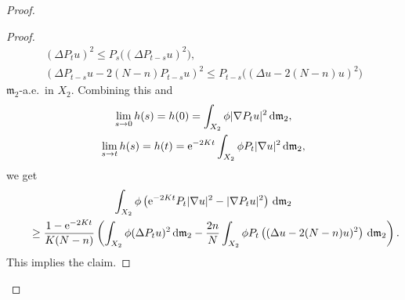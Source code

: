 \documentclass[pdftex]{sigma}
\numberwithin{equation}{section}
\theoremstyle{definition}
\newcommand{\mf}{\mathfrak{m}}
\begin{document}
\begin{proof}
\begin{proof}
\begin{gather*}
 (\Delta P_{t} u)^2\leq P_{s}\big((\Delta P_{t-s} u)^2\big),
 \\
 (\Delta P_{t-s} u-2(N-n)P_{t-s} u)^2\leq P_{t-s} \big( (\Delta u-2(N-n)u)^2\big)
\end{gather*}
$\mf_2$-a.e.\ in $X_2$. Combining this and
\begin{gather*}
\lim_{s\to 0} h(s)=h(0)=\int_{X_2}\phi |\nabla P_t u|^2\,{\rm d}\mf_2,
\\
\lim_{s\to t} h(s)=h(t)={\rm e}^{-2K t}\int_{X_2}\phi P_t |\nabla u|^2\,{\rm d}\mf_2,
\end{gather*}
we get
\begin{gather*}
\int_{X_2}\phi \left({\rm e}^{-2K t} P_t |\nabla u|^2-|\nabla P_t u|^2\right)\,{\rm d}\mf_2
\\ \qquad
{}\geq \frac{1-{\rm e}^{-2 K t}}{K(N-n)}\left(\int_{X_2}\phi (\Delta P_{t} u)^2\,{\rm d}\mf_2
-\frac{2n}{N}\int_{X_2} \phi P_t\left( (\Delta u-2(N-n)u)^2\right)\,{\rm d}\mf_2 \right) .
\end{gather*}
This implies the claim.
\end{proof}


\end{proof}
\end{document}

